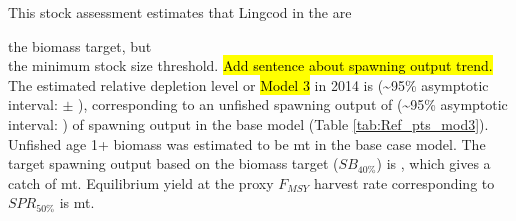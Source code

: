 \documentclass[12pt,]{article}
\begin{document}
This stock assessment estimates that Lingcod in the are

the biomass target, but\\
the minimum stock size threshold.
\hl{Add sentence about spawning output trend.} The estimated relative
depletion level or \hl{Model 3} in 2014 is (\textasciitilde{}95\%
asymptotic interval: \(\pm\) ), corresponding to an unfished spawning
output of (\textasciitilde{}95\% asymptotic interval: ) of spawning
output in the base model (Table \ref{tab:Ref_pts_mod3}). Unfished age 1+
biomass was estimated to be mt in the base case model. The target
spawning output based on the biomass target (\(SB_{40\%}\)) is , which
gives a catch of mt. Equilibrium yield at the proxy \(F_{MSY}\) harvest
rate corresponding to \(SPR_{50\%}\) is mt.

\FloatBarrier
\end{document}
